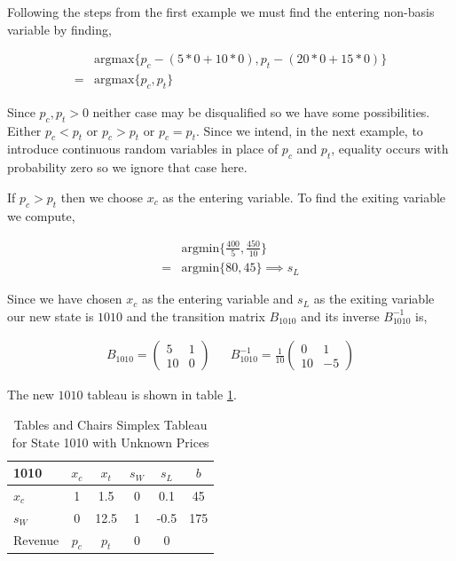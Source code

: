 Following the steps from the first example we must find the entering
non-basis variable by finding,

\begin{align*}
  &\text{argmax}\{p_c - (5*0 + 10*0), p_t - (20*0 + 15*0)\}\\
= &\text{argmax}\{p_c, p_t\}
\end{align*}

Since $p_c, p_t > 0$ neither case may be disqualified so we have some
possibilities. Either $p_c < p_t$ or $p_c > p_t$ or $p_c = p_t$. Since
we intend, in the next example, to introduce continuous random
variables in place of $p_c$ and $p_t$, equality occurs with
probability zero so we ignore that case here.

If $p_c > p_t$ then we choose $x_c$ as the entering variable. To find
the exiting variable we compute,

\begin{align*}
  &\text{argmin}\{\frac{400}{5}, \frac{450}{10}\}\\
= &\text{argmin}\{80, 45\} \implies s_L
\end{align*}

Since we have chosen $x_c$ as the entering variable and $s_L$ as the
exiting variable our new state is $1010$ and the transition matrix $B_{1010}$
and its inverse $B_{1010}^{-1}$ is,

\begin{align*}
B_{1010} = \begin{pmatrix}5&1\\10&0\end{pmatrix} && B_{1010}^{-1} = \frac{1}{10}\begin{pmatrix}0&1\\10&-5\end{pmatrix}\end{align*}

The new $1010$ tableau is shown in table \ref{tab:tcp1010}.

\begin{table}
\centering
\begin{tabular}{| l | c c c c | c |}
\hline
1010    & $x_c$ & $x_t$ & $s_W$ & $s_L$ & $b$\\
\hline
$x_c$   & 1     & 1.5    & 0     & 0.1   & 45\\
$s_W$   & 0     & 12.5   & 1     & -0.5  & 175\\
\hline
Revenue & $p_c$ & $p_t$ & 0     & 0     &\\
\hline
\end{tabular}
  \caption[Tables and Chairs Simplex Tableau for State 1010 with Unknown Prices]
          {Tables and Chairs Simplex Tableau for State 1010 with Unknown Prices}
  \label{tab:tcp1010}
\end{table}

